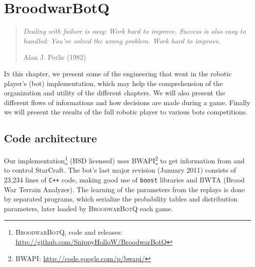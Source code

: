 \chapter{BroodwarBotQ}%
\label{chapter:bot}



\begin{quotation}
\textit{Dealing with failure is easy: Work hard to improve. Success is also easy to handled: You've solved the wrong problem. Work hard to improve.}\\
\begin{flushright}Alan J. Perlis (1982)\end{flushright}
\end{quotation}

\lettrine{I}{n} this chapter, we present some of the engineering that went in the robotic player's (bot) implementation, which may help the comprehension of the organization and utility of the different chapters. We will also present the different flows of informations and how decisions are made during a game. Finally we will present the results of the full robotic player to various bots competitions.




\section{Code architecture}

\label{sec:codearchitecture}

Our implementation\footnote{\textsc{BroodwarBotQ}, code and releases: \url{http://github.com/SnippyHolloW/BroodwarBotQ}} (BSD licensed) uses BWAPI\footnote{BWAPI: \url{http://code.google.com/p/bwapi/}} to get information from and to control StarCraft. The bot's last major revision (January 2011) consists of 23,234 lines of \texttt{C++} code, making good use of \texttt{boost} libraries and BWTA (Brood War Terrain Analyzer). The learning of the parameters from the replays is done by separated programs, which serialize the probability tables and distribution parameters, later loaded by \textsc{BroodwarBotQ} each game.


